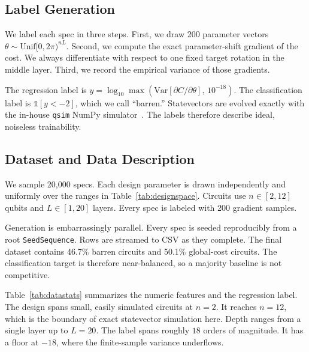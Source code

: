 \documentclass[quantumrep,article,submit,pdftex,oneauthor]{Definitions/mdpi}
\newcommand{\Nrows}{20{,}000}
\newcommand{\Nspecs}{20{,}000}
\newcommand{\Samples}{200}
\newcommand{\QubitLo}{2}
\newcommand{\QubitHi}{12}
\newcommand{\LayerLo}{1}
\newcommand{\LayerHi}{20}
\newcommand{\GlobalFrac}{50.1}
\newcommand{\BarrenFrac}{46.7}
\begin{document}
\subsection{Label Generation}
We label each spec in three steps. First, we draw \Samples{} parameter vectors
$\theta\sim\mathrm{Unif}[0,2\pi)^{nL}$. Second, we compute the exact
parameter-shift gradient of the cost. We always differentiate with respect to one
fixed target rotation in the middle layer. Third, we record the empirical
variance of those gradients.

The regression label is
$y=\log_{10}\max(\mathrm{Var}[\partial C/\partial\theta],\,10^{-18})$. The
classification label is $\mathbb{1}[y<-2]$, which we call ``barren.''
Statevectors are evolved exactly with the in-house \texttt{qsim} NumPy
simulator~\cite{eshyana2026}. The labels therefore describe ideal, noiseless
trainability.

\subsection{Dataset and Data Description}
We sample \Nspecs{} specs. Each design parameter is drawn independently and
uniformly over the ranges in Table~\ref{tab:designspace}. Circuits use
$n\in[\QubitLo,\QubitHi]$ qubits and $L\in[\LayerLo,\LayerHi]$ layers. Every spec
is labeled with \Samples{} gradient samples.

Generation is embarrassingly parallel. Every spec is seeded reproducibly from a
root \texttt{SeedSequence}. Rows are streamed to CSV as they complete. The final
dataset contains \BarrenFrac{}\% barren circuits and \GlobalFrac{}\% global-cost
circuits. The classification target is therefore near-balanced, so a majority
baseline is not competitive.

\begin{table}[H]
\caption{Sampled design space. Each spec draws these parameters independently and
uniformly.\label{tab:designspace}}
\centering

\end{table}

Table~\ref{tab:datastats} summarizes the numeric features and the regression
label. The design spans small, easily simulated circuits at $n=2$. It reaches
$n=12$, which is the boundary of exact statevector simulation here. Depth ranges
from a single layer up to $L=20$. The label spans roughly $18$ orders of
magnitude. It has a floor at $-18$, where the finite-sample variance underflows.

\begin{table}[H]
\caption{Descriptive statistics of the numeric features and the trainability label
over all \Nrows{} circuits.\label{tab:datastats}}
\centering

\end{table}
\end{document}
